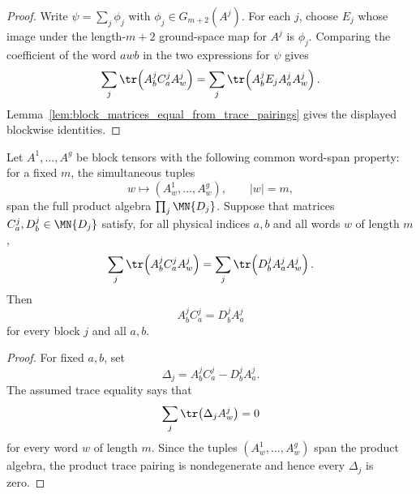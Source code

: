 \begin{proof}
    \leanok
    Write $\psi=\sum_j\phi_j$ with $\phi_j\in G_{m+2}(A^j)$. For each
    $j$, choose $E_j$ whose image under the length-$m+2$ ground-space map
    for $A^j$ is $\phi_j$. Comparing the coefficient of the word $awb$
    in the two expressions for $\psi$ gives
    \[
        \sum_j\tr\!\left(A^j_b C^j_a A^j_w\right)
        =
        \sum_j\tr\!\left(A^j_bE_jA^j_aA^j_w\right).
    \]
    Lemma~\ref{lem:block_matrices_equal_from_trace_pairings} gives the displayed
    blockwise identities.
\end{proof}

\begin{lemma}
    \label{lem:blockwise_boundary_compatibility_from_traces}
    \leanok
    Let $A^1,\ldots,A^g$ be block tensors with the following common
    word-span property: for a fixed $m$, the simultaneous tuples
    \[
        w\longmapsto
        \left(A^1_w,\ldots,A^g_w\right),
        \qquad |w|=m,
    \]
    span the full product algebra
    $\prod_j \MN{D_j}$.
    Suppose that matrices $C^j_a,D^j_b\in \MN{D_j}$ satisfy,
    for all physical indices $a,b$ and all words $w$ of length $m$,
    \[
        \sum_j \tr\!\left(A^j_b C^j_a A^j_w\right)
        =
        \sum_j \tr\!\left(D^j_b A^j_a A^j_w\right).
    \]
    Then
    \[
        A^j_bC^j_a=D^j_bA^j_a
    \]
    for every block $j$ and all $a,b$.
\end{lemma}

\begin{proof}
    \leanok
    For fixed $a,b$, set
    \[
        \Delta_j=A^j_bC^j_a-D^j_bA^j_a .
    \]
    The assumed trace equality says that
    \[
        \sum_j \tr\!\left(\Delta_jA^j_w\right)=0
    \]
    for every word $w$ of length $m$.  Since the tuples
    $(A^1_w,\ldots,A^g_w)$ span the product algebra, the product trace
    pairing is nondegenerate and hence every $\Delta_j$ is zero.
\end{proof}

